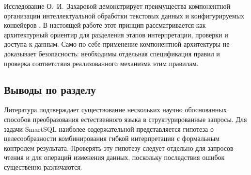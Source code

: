 Исследование О.~И.~Захаровой демонстрирует преимущества компонентной организации интеллектуальной обработки текстовых данных и конфигурируемых конвейеров \cite{zakharova2025}. В настоящей работе этот принцип рассматривается как архитектурный ориентир для разделения этапов интерпретации, проверки и доступа к данным. Само по себе применение компонентной архитектуры не доказывает безопасность: необходимы отдельная спецификация правил и проверка соответствия реализованного механизма этим правилам.

\subsection{Выводы по разделу}

Литература подтверждает существование нескольких научно обоснованных способов преобразования естественного языка в структурированные запросы. Для задачи SmartSQL наиболее содержательной представляется гипотеза о целесообразности комбинирования гибкой интерпретации с формальным контролем результата. Проверять эту гипотезу следует отдельно для запросов чтения и для операций изменения данных, поскольку последствия ошибок существенно различаются.